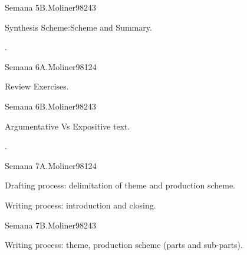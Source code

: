 \begin{syllabus}
\begin{unit}{}{Semana 5B.}{Moliner98}{24}{3}
   \begin{topics}
      \item Synthesis Scheme:Scheme and Summary.
   \end{topics}

   \begin{learningoutcomes}
      \item .
      \end{learningoutcomes}
\end{unit}

\begin{unit}{}{Semana 6A.}{Moliner98}{12}{4}
   \begin{topics}
      \item Review Exercises.
   \end{topics}
   \begin{learningoutcomes}
      \item 
   \end{learningoutcomes}
\end{unit}

\begin{unit}{}{Semana 6B.}{Moliner98}{24}{3}
   \begin{topics}
      \item Argumentative Vs Expositive text.
   \end{topics}

   \begin{learningoutcomes}
      \item . 
      \end{learningoutcomes}
\end{unit}

\begin{unit}{}{Semana 7A.}{Moliner98}{12}{4}
   \begin{topics}
      \item Drafting process: delimitation of theme and production scheme.
      \item Writing process: introduction and closing.
   \end{topics}
   \begin{learningoutcomes}
      \item 
   \end{learningoutcomes}
\end{unit}

\begin{unit}{}{Semana 7B.}{Moliner98}{24}{3}
   \begin{topics}
      \item Writing process: theme, production scheme (parts and sub-parts). 
   \end{topics}


\end{unit}
\end{syllabus}
